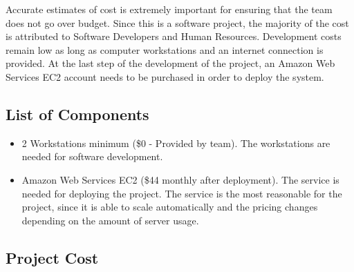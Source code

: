 \label{sec:Budget}

Accurate estimates of cost is extremely important for ensuring that the team
does not go over budget. Since this is a software project, the majority of the
cost is attributed to Software Developers and Human Resources. Development costs
remain low as long as computer workstations and an internet connection is
provided. At the last step of the development of the project, an Amazon Web
Services EC2 account needs to be purchased in order to deploy the system.

\subsection{List of Components}

\begin{itemize}
\item 2 Workstations minimum (\$0 - Provided by team). The workstations are
needed for software development.
\item Amazon Web Services EC2 (\$44 monthly after deployment). The service is
needed for deploying the project. The service is the most reasonable for the
project, since it is able to scale automatically and the pricing changes
depending on the amount of server usage.

\end{itemize}

\subsection{Project Cost}
